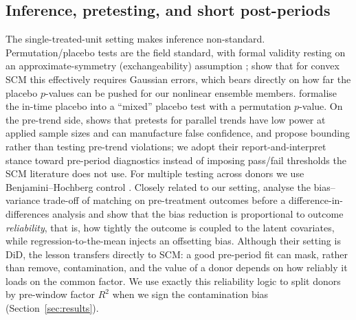 \documentclass[11pt,a4paper]{article}
\begin{document}
\subsection{Inference, pretesting, and short post-periods}
The single-treated-unit setting makes inference non-standard. Permutation/placebo
tests \citep{abadie2010,abadie2015} are the field standard, with formal validity
resting on an approximate-symmetry (exchangeability) assumption
\citep{canay2017,lehmannromano2005}; \citet{hahnshi2017} show that for convex SCM this
effectively requires Gaussian errors, which bears directly on how far the placebo
$p$-values can be pushed for our nonlinear ensemble members. \citet{chenyan2023}
formalise the in-time placebo into a ``mixed'' placebo test with a permutation
$p$-value. On the pre-trend side, \citet{roth2022} shows that pretests for parallel
trends have low power at applied sample sizes and can manufacture false confidence,
and \citet{rambachanroth2023} propose bounding rather than testing pre-trend
violations; we adopt their report-and-interpret stance toward pre-period diagnostics
instead of imposing pass/fail thresholds the SCM literature does not use. For multiple
testing across donors we use Benjamini--Hochberg control \citep{benjaminihochberg1995}.
Closely related to our setting, \citet{hammiratrix2024} analyse the bias--variance
trade-off of matching on pre-treatment outcomes before a difference-in-differences
analysis and show that the bias reduction is proportional to outcome
\emph{reliability}, that is, how tightly the outcome is coupled to the latent
covariates, while regression-to-the-mean injects an offsetting bias. Although their
setting is DiD, the lesson transfers directly to SCM: a good pre-period fit can mask,
rather than remove, contamination, and the value of a donor depends on how reliably it
loads on the common factor. We use exactly this reliability logic to split donors by
pre-window factor $R^2$ when we sign the contamination bias
(Section~\ref{sec:results}).
\end{document}
